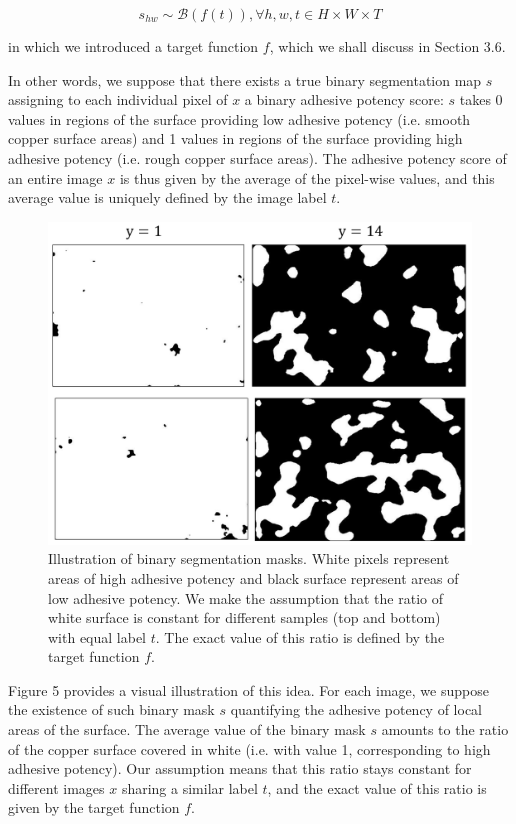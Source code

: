 \documentclass[10pt,twocolumn,letterpaper]{article}
\begin{document}
\begin{equation}
  s_{hw} \sim \mathcal{B}(f(t)), \forall h,w,t \in H \times W \times T
\end{equation}

in which we introduced a target function $f$, which we shall discuss in Section 3.6.

In other words, we suppose that there exists a true binary segmentation map
$s$ assigning to each individual pixel of $x$ a binary adhesive potency score:
$s$ takes 0 values in regions of the surface providing low adhesive potency (i.e. smooth copper surface areas)
and 1 values in regions of the surface providing high adhesive potency (i.e. rough copper surface areas).
The adhesive potency score of an entire image $x$ is thus given by the average of the pixel-wise values,
and this average value is uniquely defined by the image label $t$.

\begin{figure}[h]
\centering
\includegraphics[width=0.9\linewidth]{"./figures/Figure5"}
\caption{
Illustration of binary segmentation masks. 
White pixels represent areas of high adhesive potency
and black surface represent areas of low adhesive potency.
We make the assumption that the ratio of white surface is 
constant for different samples (top and bottom) with equal label $t$.
The exact value of this ratio is defined by the target function $f$.
}
\end{figure}

Figure 5 provides a visual illustration of this idea.
For each image, we suppose the existence of such binary mask $s$
quantifying the adhesive potency of local areas of the surface.
The average value of the binary mask $s$ amounts to the ratio of the copper surface covered in white 
(i.e. with value 1, corresponding to high adhesive potency).
Our assumption means that this ratio stays constant for different 
images $x$ sharing a similar label $t$,
and the exact value of this ratio is given by the target function $f$.
\end{document}
